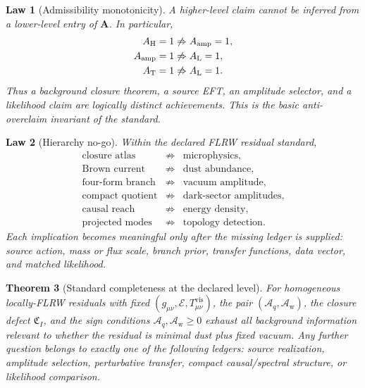 \documentclass[
  aps,
  prd,
  reprint,
  superscriptaddress,
  floatfix,
  nofootinbib,
  longbibliography
]{revtex4-2}
\theoremstyle{plain}
\newtheorem{theorem}{Theorem}
\newtheorem{law}[theorem]{Law}
\theoremstyle{definition}
\theoremstyle{remark}
\newcommand{\vis}{\mathrm{vis}}
\newcommand{\Aq}{\mathcal A_q}
\newcommand{\Aw}{\mathcal A_{\mathrm w}}
\begin{document}
\begin{law}[Admissibility monotonicity]
A higher-level claim cannot be inferred from a lower-level entry of
\(\mathbf A\).  In particular,
\begin{align}
A_{\rm H}=1&\not\Rightarrow A_{\rm amp}=1,\nonumber\\
A_{\rm amp}=1&\not\Rightarrow A_{\rm L}=1,\nonumber\\
A_{\rm T}=1&\not\Rightarrow A_{\rm L}=1 .
\label{eq:admissibility_monotonicity_v28}
\end{align}
Thus a background closure theorem, a source EFT, an amplitude selector, and a
likelihood claim are logically distinct achievements.  This is the basic
anti-overclaim invariant of the standard.
\end{law}

\begin{law}[Hierarchy no-go]
Within the declared FLRW residual standard,
\begin{equation}
\begin{array}{rcl}
\text{closure atlas} &\not\Rightarrow& \text{microphysics},\\
\text{Brown current} &\not\Rightarrow& \text{dust abundance},\\
\text{four-form branch} &\not\Rightarrow& \text{vacuum amplitude},\\
\text{compact quotient} &\not\Rightarrow& \text{dark-sector amplitudes},\\
\text{causal reach} &\not\Rightarrow& \text{energy density},\\
\text{projected modes} &\not\Rightarrow& \text{topology detection}.
\end{array}
\label{eq:hierarchy_nogo_v28}
\end{equation}
Each implication becomes meaningful only after the missing ledger is supplied:
source action, mass or flux scale, branch prior, transfer functions, data vector,
and matched likelihood.
\end{law}

\begin{theorem}[Standard completeness at the declared level]
For homogeneous locally-FLRW residuals with fixed
\((g_{\mu\nu},\mathcal E,T^{\vis}_{\mu\nu})\), the pair \((\Aq,\Aw)\), the
closure defect \(\mathfrak C_I\), and the sign conditions \(\Aq,\Aw\ge0\)
exhaust all background information relevant to whether the residual is minimal
dust plus fixed vacuum.  Any further question belongs to exactly one of the
following ledgers: source realization, amplitude selection, perturbative
transfer, compact causal/spectral structure, or likelihood comparison.
\label{thm:standard_completeness_v28}
\end{theorem}
\end{document}
